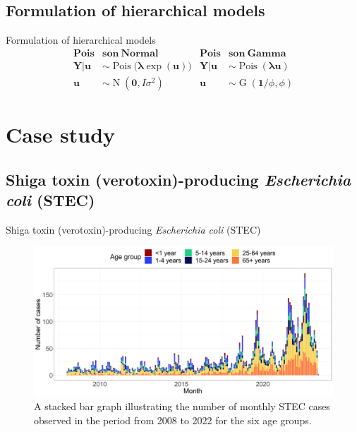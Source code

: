 \documentclass[aspectratio=169]{beamer}
\DeclareMathOperator{\G}{G}
\DeclareMathOperator{\N}{N}
\DeclareMathOperator{\Pois}{Pois}
\begin{document}
\hypertarget{formulation-of-hierarchical-models}{%
\subsection{Formulation of hierarchical
models}\label{formulation-of-hierarchical-models}}

\begin{frame}{Formulation of hierarchical models}
\begin{align*}
  \mathbf{Pois}&\mathbf{son} \ \mathbf{Normal} & \mathbf{Pois}&\mathbf{son} \ \mathbf{Gamma} \\
  \boldsymbol{Y|u} &\sim \Pois \big( \boldsymbol{\lambda} \exp(\boldsymbol{u}) \big) & \boldsymbol{Y|u} &\sim \Pois (\boldsymbol{\lambda u}) \\
  \boldsymbol{u} &\sim \N(\boldsymbol{0},I\sigma^2) & \boldsymbol{u} &\sim \G(\boldsymbol 1/\phi,\phi)
\end{align*}
\end{frame}

\hypertarget{case-study}{%
\section{Case study}\label{case-study}}

\hypertarget{shiga-toxin-verotoxin-producing-escherichia-coli-stec}{%
\subsection{\texorpdfstring{Shiga toxin (verotoxin)-producing
\emph{Escherichia coli}
(STEC)}{Shiga toxin (verotoxin)-producing Escherichia coli (STEC)}}\label{shiga-toxin-verotoxin-producing-escherichia-coli-stec}}

\begin{frame}{Shiga toxin (verotoxin)-producing \emph{Escherichia coli}
(STEC)}
\tiny

\begin{figure}[H]
\includegraphics[width=0.75\linewidth]{../figures/STEC_long_plot} \caption{A stacked bar graph illustrating the number of monthly STEC cases observed in the period from 2008 to 2022 for the six age groups.}\label{fig:STEC}
\end{figure}

\normalsize
\end{frame}
\end{document}
